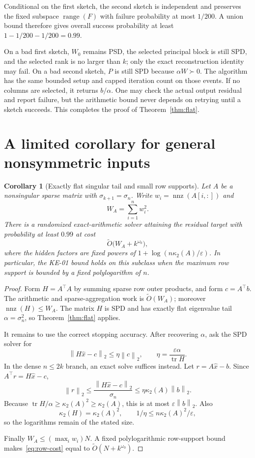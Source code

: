 \documentclass[11pt,a4paper]{article}
\newcommand{\nnz}{\operatorname{nnz}}
\newcommand{\tr}{\operatorname{tr}}
\newcommand{\range}{\operatorname{range}}
\newcommand{\softO}{\widetilde O}
\newcommand{\cond}{\kappa_2}
\newcommand{\eps}{\varepsilon}
\newcommand{\norm}[1]{\left\lVert #1\right\rVert}
\newtheorem{corollary}[theorem]{Corollary}
\theoremstyle{definition}
\theoremstyle{remark}
\begin{document}
Conditional on the first sketch, the second sketch is independent and preserves the fixed subspace $\range(F)$ with failure probability at most $1/200$. A union bound therefore gives overall success probability at least $1-1/200-1/200=0.99$.

On a bad first sketch, $W_0$ remains PSD, the selected principal block is still SPD, and the selected rank is no larger than $k$; only the exact reconstruction identity may fail. On a bad second sketch, $P$ is still SPD because $\alpha W\succ0$. The algorithm has the same bounded setup and capped iteration count on those events. If no columns are selected, it returns $b/\alpha$. One may check the actual output residual and report failure, but the arithmetic bound never depends on retrying until a sketch succeeds. This completes the proof of Theorem~\ref{thm:flat}.

\section{A limited corollary for general nonsymmetric inputs}
\label{sec:cor}
\begin{corollary}[Exactly flat singular tail and small row supports]
\label{cor:rows}
Let $A$ be a nonsingular sparse matrix with $\sigma_{k+1}=\sigma_n$. Write $w_i=\nnz(A[i,:])$ and
\[
 W_A=\sum_{i=1}^n w_i^2.
\]
There is a randomized exact-arithmetic solver attaining the residual target with probability at least $0.99$ at cost
\begin{equation}
 \softO\bigl(W_A+k^{\omega_0}\bigr), \label{eq:row-cost}
\end{equation}
where the hidden factors are fixed powers of $1+\log(n\cond(A)/\eps)$. In particular, the KE-01 bound holds on this subclass when the maximum row support is bounded by a fixed polylogarithm of $n$.
\end{corollary}
\begin{proof}
Form $H=A^\top A$ by summing sparse row outer products, and form $c=A^\top b$. The arithmetic and sparse-aggregation work is $\softO(W_A)$; moreover $\nnz(H)\le W_A$. The matrix $H$ is SPD and has exactly flat eigenvalue tail $\alpha=\sigma_n^2$, so Theorem~\ref{thm:flat} applies.

It remains to use the correct stopping accuracy. After recovering $\alpha$, ask the SPD solver for
\[
 \norm{H\widehat x-c}_2\le\eta\norm c_2,
 \qquad \eta=\frac{\eps\alpha}{\tr H}.
\]
In the dense $n\le2k$ branch, an exact solve suffices instead. Let $r=A\widehat x-b$. Since $A^\top r=H\widehat x-c$,
\[
 \norm r_2\le\frac{\norm{H\widehat x-c}_2}{\sigma_n}
 \le\eta\cond(A)\norm b_2.
\]
Because $\tr H/\alpha\ge\cond(A)^2\ge\cond(A)$, this is at most $\eps\norm b_2$. Also
\[
 \cond(H)=\cond(A)^2,\qquad
 1/\eta\le n\cond(A)^2/\eps,
\]
so the logarithms remain of the stated size.

Finally $W_A\le(\max_iw_i)N$. A fixed polylogarithmic row-support bound makes~\eqref{eq:row-cost} equal to $\softO(N+k^{\omega_0})$.
\end{proof}
\end{document}
